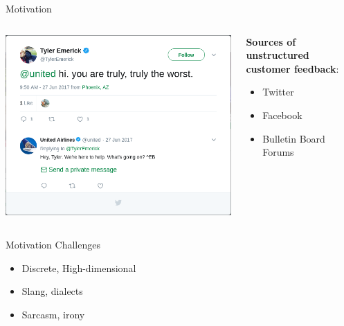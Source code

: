 \documentclass[aspectratio=169]{beamer}
\begin{document}
\begin{frame}{Motivation}

	\begin{columns}[T] %
		\begin{column}{.45\textwidth}
			\includegraphics[width=.9\textwidth]{images/twitter-status.png}
		\end{column}
		\hfill
		\begin{column}{.45\textwidth}
			\textbf{Sources of {\color{red}unstructured} customer feedback}:
			\begin{itemize}
				\item Twitter
				\item Facebook
				\item Bulletin Board Forums
			\end{itemize}
		\end{column}
	\end{columns}
\end{frame}

\begin{frame}{Motivation}
	\centering
	{\Huge Challenges} \\
	\vspace{1cm}
	\begin{center}
		\begin{minipage}{0.4\textwidth}
			\begin{itemize}
				\item Discrete, High-dimensional
				\item Slang, dialects
				\item Sarcasm, irony
			\end{itemize}
		\end{minipage}
	\end{center}
\end{frame}
\end{document}
